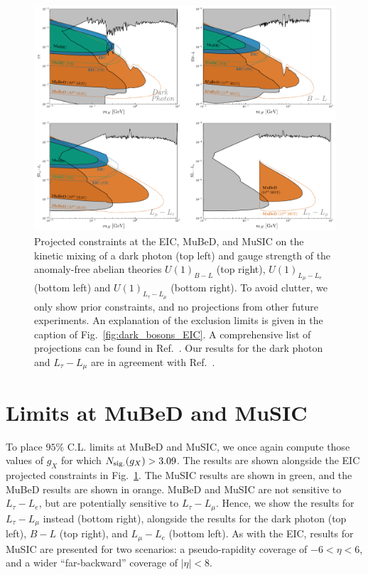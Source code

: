 \begin{figure}[t!]
    \centering
\includegraphics[width=\linewidth]{figures/chapter6/dark_bosons_MuBeD_MuSIC.pdf}
    \caption[Projected constraints at the EIC, MuBeD, and MuSIC on the kinetic mixing of a dark photon and gauge strength of anomaly-free abelian theories.]{Projected constraints at the EIC, MuBeD, and MuSIC on the kinetic mixing of a dark photon (top left) and gauge strength of the anomaly-free abelian theories $U(1)_{B-L}$ (top right), $U(1)_{L_\mu - L_e}$ (bottom left) and $U(1)_{L_\tau - L_\mu}$ (bottom right). To avoid clutter, we only show prior constraints, and no projections from other future experiments. An explanation of the exclusion limits is given in the caption of Fig.~\ref{fig:dark_bosons_EIC}. A comprehensive list of projections can be found in Ref.~\cite{Bauer:2018onh}. Our results for the dark photon and $L_\tau - L_\mu$ are in agreement with Ref.~\cite{Cesarotti:2022ttv}.}
    \label{fig:dark_bosons_MuBeD_MuSIC}
\end{figure}



\section{Limits at MuBeD and MuSIC}\label{sec:vector_MuBeD_MuSIC_limits}

To place $95\%$ C.L. limits at MuBeD and MuSIC, we once again compute those values of $g_X$ for which $N_{\rm sig.}(g_X) > 3.09$. The results are shown alongside the EIC projected constraints in Fig.~\ref{fig:dark_bosons_MuBeD_MuSIC}. The MuSIC results are shown in green, and the MuBeD results are shown in orange.  MuBeD and MuSIC are not sensitive to $L_\tau - L_e$, but are potentially sensitive to $L_\tau - L_\mu$. Hence, we show the results for $L_\tau-L_\mu$ instead (bottom right), alongside the results for the dark photon (top left), $B-L$ (top right), and $L_\mu - L_e$ (bottom left). As with the EIC, results for MuSIC are presented for two scenarios: a pseudo-rapidity coverage of $-6 < \eta < 6$, and a wider ``far-backward'' coverage of $|\eta| < 8$. 

